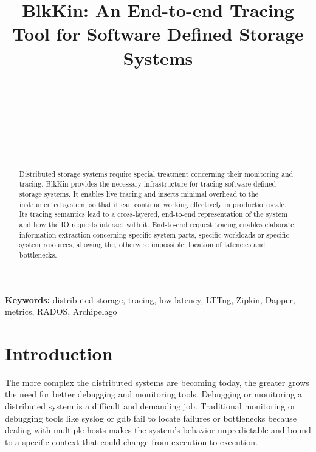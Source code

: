 \documentclass[11pt,journal,compsoc]{IEEEtran}
\begin{document}
\title{BlkKin: An End-to-end Tracing Tool for Software Defined Storage Systems}
\author{
\\
\and
{}\\
\and
{}\\
\and
{}\\
\and
{}
}

\maketitle

\begin{abstract}
Distributed storage systems require special treatment concerning their
monitoring and tracing. BlkKin provides the necessary infrastructure for tracing
software-defined storage systems. It enables live tracing and inserts minimal
overhead to the instrumented system, so that it can continue working effectively
in production scale. Its tracing semantics lead to a cross-layered, end-to-end
representation of the system and how the IO requests interact with it.
End-to-end request tracing enables elaborate information extraction concerning
specific system parts, specific workloads or specific system resources, allowing
the, otherwise impossible, location of latencies and bottlenecks.
\end{abstract}

\textbf{Keywords: } distributed storage, tracing, low-latency, LTTng, Zipkin, Dapper, metrics, RADOS, Archipelago

\section{Introduction}

The more complex the distributed systems are becoming today, the greater grows
the need for better debugging and monitoring tools. Debugging or monitoring a
distributed system is a difficult and demanding job. Traditional monitoring or
debugging tools like syslog or gdb fail to locate failures or bottlenecks
because dealing with multiple hosts makes the system's behavior unpredictable
and bound to a specific context that could change from execution to execution.
\end{document}
